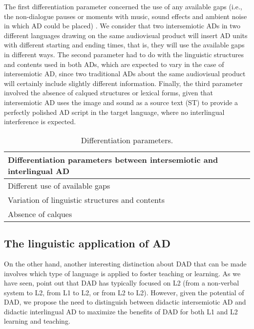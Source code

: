 \documentclass[english]{textolivre}
\begin{document}
The first differentiation parameter concerned the use of any available gaps (i.e., the non-dialogue pauses or moments with music, sound effects and ambient noise in which AD could be placed) \cite{isoiec2015}. We consider that two intersemiotic ADs in two different languages drawing on the same audiovisual product will insert AD units with different starting and ending times, that is, they will use the available gaps in different ways. The second parameter had to do with the linguistic structures and contents used in both ADs, which are expected to vary in the case of intersemiotic AD, since two traditional ADs about the same audiovisual product will certainly include slightly different information. Finally, the third parameter involved the absence of calqued structures or lexical forms, given that intersemiotic AD uses the image and sound as a source text (ST) to provide a perfectly polished AD script in the target language, where no interlingual interference is expected.

\begin{table}[h!]
\centering
\begin{threeparttable}
\caption{Differentiation parameters.}
\label{tbl1}
\begin{tabular}{l}
\toprule
Differentiation parameters between intersemiotic and interlingual AD \\ 
\midrule
Different use of available gaps \\
Variation of linguistic structures and contents \\
Absence of calques \\
\bottomrule
\end{tabular}
\end{threeparttable}
\end{table}



\subsection{The linguistic application of AD}\label{sec-modelo}
On the other hand, another interesting distinction about DAD that can be made involves which type of language is applied to foster teaching or learning. As we have seen, \textcite{talavan_lertola_fernandez-costales2024} point out that DAD has typically focused on L2 (from a non-verbal system to L2, from L1 to L2, or from L2 to L2). However, given the potential of DAD, we propose the need to distinguish between didactic intersemiotic AD and didactic interlingual AD to maximize the benefits of DAD for both L1 and L2 learning and teaching.
\end{document}
